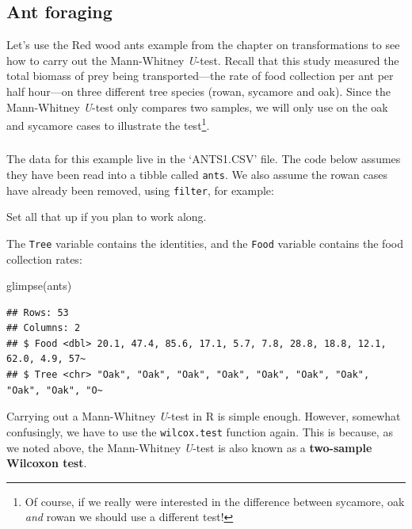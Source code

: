 \documentclass[
]{book}
\newenvironment{Shaded}{\begin{snugshade}}{\end{snugshade}}
\newcommand{\FunctionTok}[1]{\textcolor[rgb]{0.00,0.00,0.00}{#1}}
\newcommand{\NormalTok}[1]{#1}
\newenvironment{greybox}{
  \definecolor{shadecolor}{rgb}{0.95,0.95,0.95}  %
  \color{black}
  \begin{shaded}}
 {\end{shaded}}
\newenvironment{infobox}[1]
  {
  \begin{itemize}
  \renewcommand{\labelitemi}{
    \raisebox{-.7\height}[0pt][0pt]{
      {\setkeys{Gin}{width=3em,keepaspectratio}
        \texttt{[image: images/\#1]}}
    }
  }
  \setlength{\fboxsep}{1em}
  \begin{greybox}
  \item
  }
  {
  \end{greybox}
  \end{itemize}
  }
\begin{document}
\hypertarget{ant-foraging}{%
\subsection{Ant foraging}\label{ant-foraging}}

Let's use the Red wood ants example from the chapter on transformations to see how to carry out the Mann-Whitney \emph{U}-test. Recall that this study measured the total biomass of prey being transported---the rate of food collection per ant per half hour---on three different tree species (rowan, sycamore and oak). Since the Mann-Whitney \emph{U}-test only compares two samples, we will only use on the oak and sycamore cases to illustrate the test\footnote{Of course, if we really were interested in the difference between sycamore, oak \emph{and} rowan we should use a different test!}.

\begin{infobox}{action}

\hypertarget{section-22}{%
\subsubsection*{}\label{section-22}}

The data for this example live in the `ANTS1.CSV' file. The code below assumes they have been read into a tibble called \texttt{ants}. We also assume the rowan cases have already been removed, using \texttt{filter}, for example:

Set all that up if you plan to work along.

\end{infobox}

The \texttt{Tree} variable contains the identities, and the \texttt{Food} variable contains the food collection rates:

\begin{Shaded}
\begin{Highlighting}[]
\FunctionTok{glimpse}\NormalTok{(ants)}
\end{Highlighting}
\end{Shaded}

\begin{verbatim}
## Rows: 53
## Columns: 2
## $ Food <dbl> 20.1, 47.4, 85.6, 17.1, 5.7, 7.8, 28.8, 18.8, 12.1, 62.0, 4.9, 57~
## $ Tree <chr> "Oak", "Oak", "Oak", "Oak", "Oak", "Oak", "Oak", "Oak", "Oak", "O~
\end{verbatim}

Carrying out a Mann-Whitney \emph{U}-test in R is simple enough. However, somewhat confusingly, we have to use the \texttt{wilcox.test} function again. This is because, as we noted above, the Mann-Whitney \emph{U}-test is also known as a \textbf{two-sample Wilcoxon test}.
\end{document}
